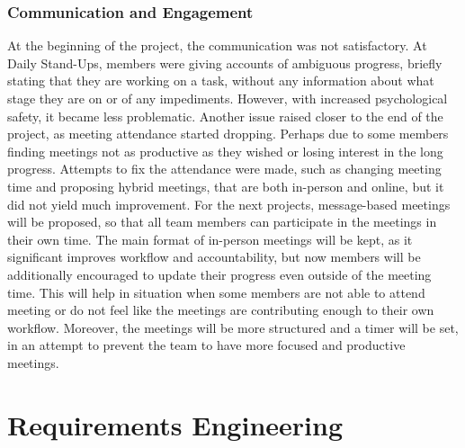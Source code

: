 \subsubsection{Communication and Engagement}
At the beginning of the project, the communication was not satisfactory. At Daily Stand-Ups, members were giving accounts of ambiguous progress, briefly stating that they are working on a task, without any information about what stage they are on or of any impediments. However, with increased psychological safety, it became less problematic. Another issue raised closer to the end of the project, as meeting attendance started dropping. Perhaps due to some members finding meetings not as productive as they wished or losing interest in the long progress. Attempts to fix the attendance were made, such as changing meeting time and proposing hybrid meetings, that are both in-person and online, but it did not yield much improvement. For the next projects, message-based meetings will be proposed, so that all team members can participate in the meetings in their own time. The main format of in-person meetings will be kept, as it significant improves workflow and accountability, but now members will be additionally encouraged to update their progress even outside of the meeting time. This will help in situation when some members are not able to attend meeting or do not feel like the meetings are contributing enough to their own workflow. Moreover, the meetings will be more structured and a timer will be set, in an attempt to prevent the team to have more focused and productive meetings.

\section{Requirements Engineering}

